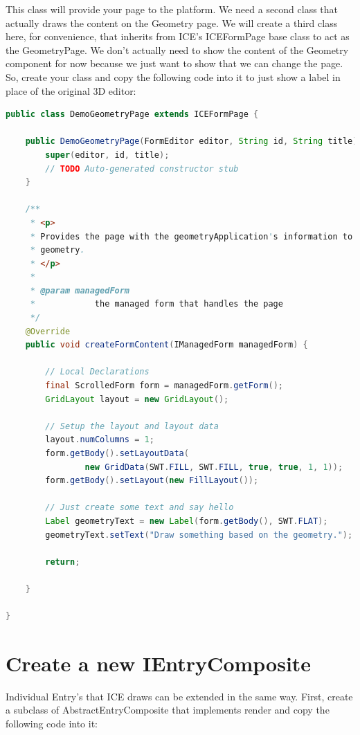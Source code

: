 \documentclass{article}
\begin{document}
This class will provide your page to the platform. We need a second class that
actually draws the content on the Geometry page. We will create a third class
here, for convenience, that inherits from ICE’s ICEFormPage base class to act
as the GeometryPage. We don’t actually need to show the content of the Geometry
component for now because we just want to show that we can change the page. So,
create your class and copy the following code into it to just show a label in
place of the original 3D editor:

\begin{lstlisting}[language=java]
public class DemoGeometryPage extends ICEFormPage {

    public DemoGeometryPage(FormEditor editor, String id, String title) {
        super(editor, id, title);
        // TODO Auto-generated constructor stub
    }

    /**
     * <p>
     * Provides the page with the geometryApplication's information to display
     * geometry.
     * </p>
     *
     * @param managedForm
     *            the managed form that handles the page
     */
    @Override
    public void createFormContent(IManagedForm managedForm) {

        // Local Declarations
        final ScrolledForm form = managedForm.getForm();
        GridLayout layout = new GridLayout();

        // Setup the layout and layout data
        layout.numColumns = 1;
        form.getBody().setLayoutData(
                new GridData(SWT.FILL, SWT.FILL, true, true, 1, 1));
        form.getBody().setLayout(new FillLayout());

        // Just create some text and say hello
        Label geometryText = new Label(form.getBody(), SWT.FLAT);
        geometryText.setText("Draw something based on the geometry.");

        return;

    }

}
\end{lstlisting}

\section{Create a new IEntryComposite}

Individual Entry’s that ICE draws can be extended in the same way. First,
create a subclass of AbstractEntryComposite that implements render and copy the
following code into it:
\end{document}
